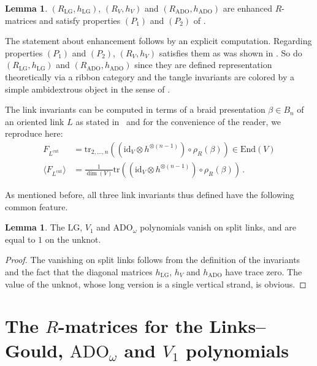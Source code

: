 \documentclass[12pt,reqno]{amsart}
\theoremstyle{definition}
\newtheorem{lemma}[theorem]{Lemma}
\def\la{\langle}
\def\ra{\rangle}
\def\b{\beta}
\def\be{\begin{equation}}
\def\ee{\end{equation}}
\def\RT{F}
\def\tr{\mathrm{tr}}
\def\End{\mathrm{End}}
\def\LG{\mathrm{LG}}
\def\ADO{\mathrm{ADO}}
\begin{document}
\begin{lemma}
$(R_{\LG},h_{\LG})$, $(R_{V},h_{V})$ and $(R_{\ADO},h_{\ADO})$ are enhanced
$R$-matrices and satisfy properties $(P_1)$ and $(P_2)$ of \cite[Sec.1.1]{GHKST}.
\end{lemma}

The statement about enhancement follows by an explicit computation. 
Regarding properties $(P_1)$ and $(P_2)$, $(R_{V},h_{V})$ satisfies them as was
shown in \cite[Sec.3]{GHKST}. So do $(R_{\LG},h_{\LG})$ and $(R_{\ADO},h_{\ADO})$
since they are defined representation theoretically via a ribbon category
and the tangle invariants are colored by a simple ambidextrous object
in the sense of \cite{GPT}.

The link invariants can be computed in terms of a braid presentation 
$\beta\in B_n$ of an oriented link $L$ as stated in~\cite[Rem.2.3]{GHKST}
and for the convenience of the reader, we reproduce here:
\be
\label{FLcut}
\begin{aligned}
\RT_{L^{\mathrm{cut}}}&=
\tr_{2,\dots, n}\left((\mathrm{id}_V\otimes
h^{\otimes (n-1)})\circ \rho_R(\b) \right)\in \End(V)
\\
\la\RT_{L^{\mathrm{cut}}}\ra
&=
\frac{1}{\dim(V)}
\tr\left((\mathrm{id}_V\otimes
h^{\otimes (n-1)})\circ \rho_R(\b)\right)\,.
\end{aligned}
\ee


As mentioned before, all three link invariants thus defined have the following
common feature.

\begin{lemma}
\label{lem.split}
The $\LG$, $V_1$ and $\ADO_\omega$ polynomials vanish on split links, and are equal to $1$ on the unknot.
\end{lemma} 

\begin{proof}
The vanishing on split links follows from the definition of the invariants
and the fact that the diagonal matrices $h_{\LG}$, $h_{V}$ and $h_{\ADO}$
have trace zero. The value of the unknot, whose long version is a single
vertical strand, is obvious. 
\end{proof}


\appendix

\section{The \texorpdfstring{$R$}{R}-matrices for the Links--Gould,
  \texorpdfstring{$\ADO_\omega$}{ADO} and
  \texorpdfstring{$V_1$}{V1} polynomials}
\label{sec.Rmat}
\end{document}
